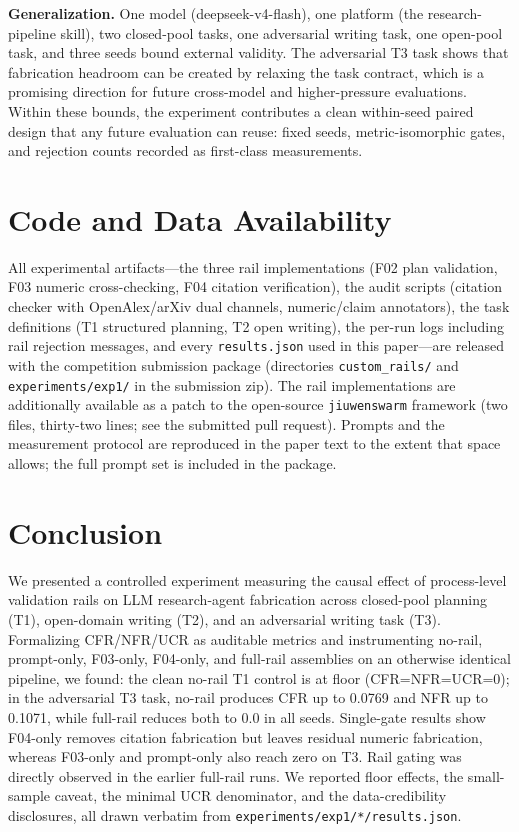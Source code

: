 \documentclass[10pt,twocolumn]{article}
\begin{document}
\textbf{Generalization.} One model (deepseek-v4-flash), one platform (the research-pipeline skill), two closed-pool tasks, one adversarial writing task, one open-pool task, and three seeds bound external validity. The adversarial T3 task shows that fabrication headroom can be created by relaxing the task contract, which is a promising direction for future cross-model and higher-pressure evaluations. Within these bounds, the experiment contributes a clean within-seed paired design that any future evaluation can reuse: fixed seeds, metric-isomorphic gates, and rejection counts recorded as first-class measurements.

\section*{Code and Data Availability}
All experimental artifacts---the three rail implementations (F02 plan validation, F03 numeric cross-checking, F04 citation verification), the audit scripts (citation checker with OpenAlex/arXiv dual channels, numeric/claim annotators), the task definitions (T1 structured planning, T2 open writing), the per-run logs including rail rejection messages, and every \texttt{results.json} used in this paper---are released with the competition submission package (directories \texttt{custom\_rails/} and \texttt{experiments/exp1/} in the submission zip). The rail implementations are additionally available as a patch to the open-source \texttt{jiuwenswarm} framework (two files, thirty-two lines; see the submitted pull request). Prompts and the measurement protocol are reproduced in the paper text to the extent that space allows; the full prompt set is included in the package.

\section{Conclusion}
\label{sec:conclusion}

We presented a controlled experiment measuring the causal effect of process-level validation rails on LLM research-agent fabrication across closed-pool planning (T1), open-domain writing (T2), and an adversarial writing task (T3). Formalizing CFR/NFR/UCR as auditable metrics and instrumenting no-rail, prompt-only, F03-only, F04-only, and full-rail assemblies on an otherwise identical pipeline, we found: the clean no-rail T1 control is at floor (CFR=NFR=UCR=0); in the adversarial T3 task, no-rail produces CFR up to 0.0769 and NFR up to 0.1071, while full-rail reduces both to 0.0 in all seeds. Single-gate results show F04-only removes citation fabrication but leaves residual numeric fabrication, whereas F03-only and prompt-only also reach zero on T3. Rail gating was directly observed in the earlier full-rail runs. We reported floor effects, the small-sample caveat, the minimal UCR denominator, and the data-credibility disclosures, all drawn verbatim from \texttt{experiments/exp1/*/results.json}.
\end{document}
